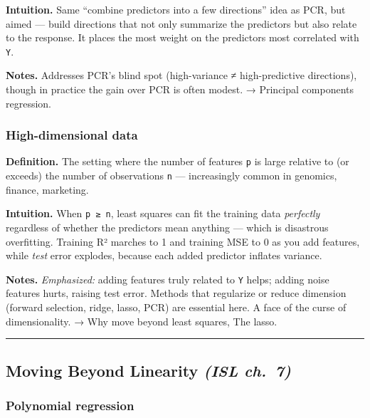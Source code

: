 \documentclass[
  10pt,
  letterpaper,
  onecolumn]{article}
\begin{document}
\textbf{Intuition.} Same ``combine predictors into a few directions''
idea as PCR, but aimed --- build directions that not only summarize the
predictors but also relate to the response. It places the most weight on
the predictors most correlated with \texttt{Y}.

\textbf{Notes.} Addresses PCR's blind spot (high-variance ≠
high-predictive directions), though in practice the gain over PCR is
often modest. → Principal components regression.

\hypertarget{high-dimensional-data}{%
\subsubsection{High-dimensional data}\label{high-dimensional-data}}

\textbf{Definition.} The setting where the number of features \texttt{p}
is large relative to (or exceeds) the number of observations \texttt{n}
--- increasingly common in genomics, finance, marketing.

\textbf{Intuition.} When \texttt{p\ ≥\ n}, least squares can fit the
training data \emph{perfectly} regardless of whether the predictors mean
anything --- which is disastrous overfitting. Training R² marches to 1
and training MSE to 0 as you add features, while \emph{test} error
explodes, because each added predictor inflates variance.

\textbf{Notes.} \emph{Emphasized:} adding features truly related to
\texttt{Y} helps; adding noise features hurts, raising test error.
Methods that regularize or reduce dimension (forward selection, ridge,
lasso, PCR) are essential here. A face of the curse of dimensionality. →
Why move beyond least squares, The lasso.

\begin{center}\rule{0.5\linewidth}{0.5pt}\end{center}

\hypertarget{moving-beyond-linearity-isl-ch.-7}{%
\subsection{\texorpdfstring{Moving Beyond Linearity \emph{(ISL
ch.~7)}}{Moving Beyond Linearity (ISL ch.~7)}}\label{moving-beyond-linearity-isl-ch.-7}}

\hypertarget{polynomial-regression}{%
\subsubsection{Polynomial regression}\label{polynomial-regression}}
\end{document}
